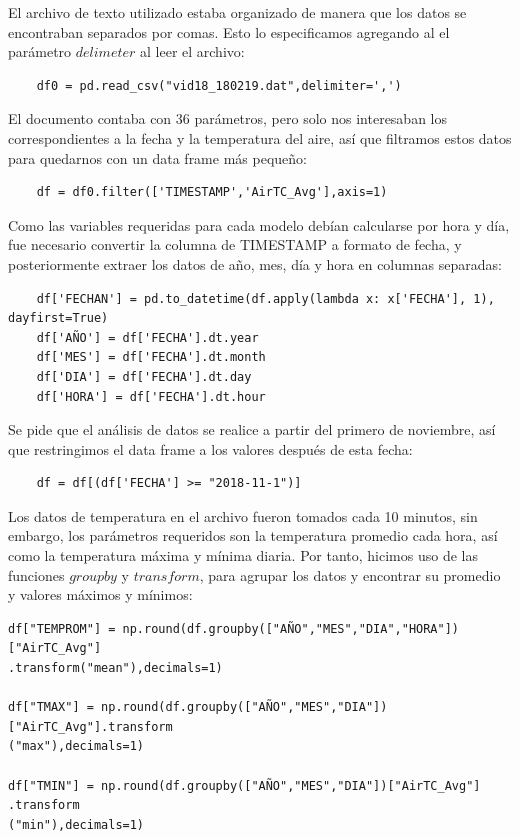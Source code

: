 \documentclass[letterpaper,12pt]{article}
\begin{document}
El archivo de texto utilizado estaba organizado de manera que los datos se encontraban separados por comas. Esto lo especificamos agregando al el parámetro $delimeter$ al leer el archivo:

\begin{verbatim}
    df0 = pd.read_csv("vid18_180219.dat",delimiter=',')
\end{verbatim}

El documento contaba con 36 parámetros, pero solo nos interesaban los correspondientes a la fecha y la temperatura del aire, así que filtramos estos datos para quedarnos con un data frame más pequeño:

\begin{verbatim}
    df = df0.filter(['TIMESTAMP','AirTC_Avg'],axis=1)
\end{verbatim}

Como las variables requeridas para cada modelo debían calcularse por hora y día, fue necesario convertir la columna de TIMESTAMP a formato de fecha, y posteriormente extraer los datos de año, mes, día y hora en columnas separadas:

\begin{verbatim}
    df['FECHAN'] = pd.to_datetime(df.apply(lambda x: x['FECHA'], 1), dayfirst=True)
    df['AÑO'] = df['FECHA'].dt.year
    df['MES'] = df['FECHA'].dt.month
    df['DIA'] = df['FECHA'].dt.day
    df['HORA'] = df['FECHA'].dt.hour
\end{verbatim}

Se pide que el análisis de datos se realice a partir del primero de noviembre, así que restringimos el data frame a los valores después de esta fecha:

\begin{verbatim}
    df = df[(df['FECHA'] >= "2018-11-1")]
\end{verbatim}

Los datos de temperatura en el archivo fueron tomados cada 10 minutos, sin embargo, los parámetros requeridos son la temperatura promedio cada hora, así como la temperatura máxima y mínima diaria. Por tanto, hicimos uso de las funciones $groupby$ y $transform$, para agrupar los datos y encontrar su promedio y valores máximos y mínimos:

\begin{verbatim}
df["TEMPROM"] = np.round(df.groupby(["AÑO","MES","DIA","HORA"])["AirTC_Avg"]
.transform("mean"),decimals=1)

df["TMAX"] = np.round(df.groupby(["AÑO","MES","DIA"])["AirTC_Avg"].transform
("max"),decimals=1)

df["TMIN"] = np.round(df.groupby(["AÑO","MES","DIA"])["AirTC_Avg"]
.transform
("min"),decimals=1)
\end{verbatim}
\end{document}
